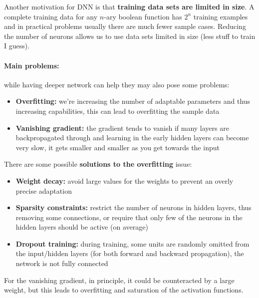 Another motivation for DNN is that \textbf{training data sets are limited in size}. A complete training data for any $n$-ary boolean function has $2^n$ training examples and in practical problems usually there are much fewer sample cases. Reducing the number of neurons allows us to use data sets limited in size (less stuff to train I guess).\\

\paragraph{Main problems:} while having deeper network can help they may also pose some problems:
\begin{itemize}
	\item \textbf{Overfitting:} we're increasing the number of adaptable parameters and thus increasing capabilities, this can lead to overfitting the sample data
	\item \textbf{Vanishing gradient:} the gradient tends to vanish if many layers are backpropagated through and learning in the early hidden layers can become very slow, it gets smaller and smaller as you get towards the input
\end{itemize}

There are some possible \textbf{solutions to the overfitting} issue: 
\begin{itemize}
	\item \textbf{Weight decay:} avoid large values for the weights to prevent an overly precise adaptation
	\item \textbf{Sparsity constraints:} restrict the number of neurons in hidden layers, thus removing some connections, or require that only few of the neurons in the hidden layers should be active (on average)
	\item \textbf{Dropout training:} during training, some units are randomly omitted from the input/hidden layers (for both forward and backward propagation), the network is not fully connected
\end{itemize}

For the vanishing gradient, in principle, it could be counteracted by a large weight, but this leads to overfitting and saturation of the activation functions.\\

\newpage

